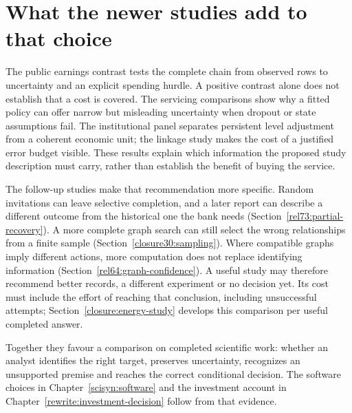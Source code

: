 \section{What the newer studies add to that choice}
The public earnings contrast tests the complete chain from observed rows to
uncertainty and an explicit spending hurdle. A positive contrast alone does
not establish that a cost is covered. The servicing comparisons show why a
fitted policy can offer narrow but misleading uncertainty when dropout or
state assumptions fail. The institutional panel separates persistent level
adjustment from a coherent economic unit; the linkage study makes the cost
of a justified error budget visible. These results explain which information
the proposed study description must carry, rather than establish the benefit
of buying the service.

The follow-up studies make that recommendation more specific. Random
invitations can leave selective completion, and a later report can describe
a different outcome from the historical one the bank needs
(Section~\ref{rel73:partial-recovery}). A more complete graph search can
still select the wrong relationships from a finite sample
(Section~\ref{closure30:sampling}). Where compatible graphs imply different
actions, more computation does not replace identifying information
(Section~\ref{rel64:graph-confidence}). A useful study may therefore
recommend better records, a different experiment or no decision yet.
Its cost must include the effort of reaching that conclusion, including
unsuccessful attempts; Section~\ref{closure:energy-study} develops this
comparison per useful completed answer.

Together they favour a comparison on completed scientific work: whether an
analyst identifies the right target, preserves uncertainty, recognizes an
unsupported premise and reaches the correct conditional decision. The
software choices in Chapter~\ref{scisyn:software} and the investment account
in Chapter~\ref{rewrite:investment-decision} follow from that evidence.
